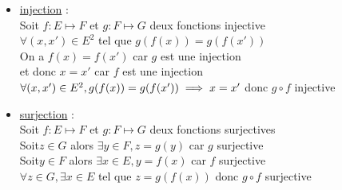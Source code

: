 \begin{dem}[Composition]
    \begin{itemize}
        \item \underline{injection} :\\
        Soit \(f : E\mapsto F\) et \(g:F\mapsto G\) deux fonctions injective \\
        \(\forall (x,x')\in E^2 \) tel que \( g(f(x)) = g(f(x'))\) \\
        On a \(f(x) = f(x')\) car \(g\) est une injection \\
        et donc \(x=x'\) car \(f\) est une injection \\
        \conclusion \(\forall (x,x')\in E^2, g(f(x)) = g(f(x')) \implies x=x'\) donc \(g\circ f\) injective\\

        \item\underline{surjection} : \\
        Soit \(f : E\mapsto F\) et \(g:F\mapsto G\) deux fonctions surjectives \\
        Soit\(z \in G\) alors \(\exists y \in F,z=g(y)\) car \(g\) surjective \\
        Soit\(y \in F\) alors \(\exists x \in E,y=f(x)\) car \(f\) surjective \\
        \conclusion \(\forall z \in G,\exists x \in E \) tel que \(z = g(f(x))\) donc \(g\circ f\) surjective
    \end{itemize}
\end{dem}

